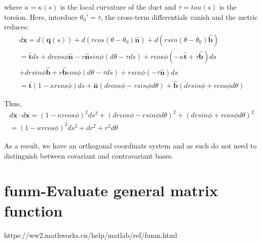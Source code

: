 \documentclass{Note}
\begin{document}
where $\kappa=\kappa(s)$ is the local curvature of the duct and $\tau=tau(s)$ is the torsion. Here, intorduce $\theta_0'=\tau$, the cross-term differentials vanish and the metric reduces:
\begin{equation}
\begin{aligned}
d\textbf{x}=d(\textbf{q}(s))+d(rcos(\theta-\theta_0) \widehat{\textbf{n}})+d(rsin(\theta-\theta_0)\widehat{\textbf{b}})\\
=\widehat{\textbf{t}}ds +dr cos\phi \widehat{\textbf{n}}-r\widehat{\textbf{n}} sin\phi (d\theta-\tau ds)+r cos\phi (-\kappa \widehat{\textbf{t}}+\tau \widehat{\textbf{b}})ds\\
+dr sin\phi \widehat{\textbf{b}}+r\widehat{\textbf{b}} cos\phi (d\theta-\tau ds)+r sin\phi (-\tau \widehat{\textbf{n}})ds\\
=\widehat{\textbf{t}}(1-\kappa r cos\phi)ds+\widehat{\textbf{n}}(dr cos\phi-rsin\phi d\theta)+\widehat{\textbf{b}}(dr sin\phi+rcos\phi d\theta)
\end{aligned}
\end{equation}

Thus,
\begin{equation}
\begin{aligned}
d\textbf{x}\cdot d\textbf{x}
={(1-\kappa r cos\phi)}^2ds^2+{(dr cos\phi-rsin\phi d\theta)}^2+{(dr sin\phi+rcos\phi d\theta)}^2\\
={(1-\kappa r cos\phi)}^2ds^2+dr^2+r^2d\theta
\end{aligned}
\end{equation}

As a result, we have an orthogonal coordinate system and as such do not need to distinguish between covariant and contravariant bases.






\section{funm-Evaluate general matrix function}

https://ww2.mathworks.cn/help/matlab/ref/funm.html
\end{document}
